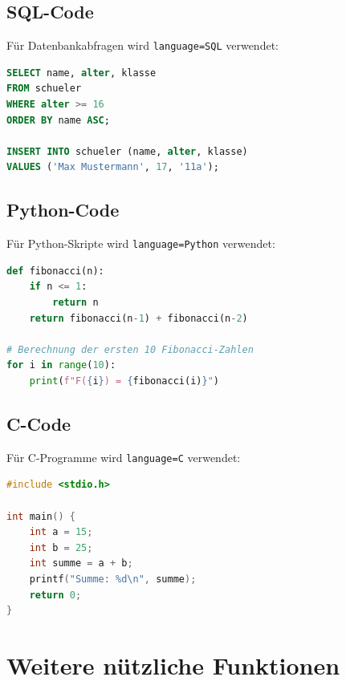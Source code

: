 \subsection{SQL-Code}

Für Datenbankabfragen wird \texttt{language=SQL} verwendet:

\begin{lstlisting}[language=SQL]
SELECT name, alter, klasse
FROM schueler
WHERE alter >= 16
ORDER BY name ASC;

INSERT INTO schueler (name, alter, klasse)
VALUES ('Max Mustermann', 17, '11a');
\end{lstlisting}



\subsection{Python-Code}

Für Python-Skripte wird \texttt{language=Python} verwendet:

\begin{lstlisting}[language=Python]
def fibonacci(n):
    if n <= 1:
        return n
    return fibonacci(n-1) + fibonacci(n-2)

# Berechnung der ersten 10 Fibonacci-Zahlen
for i in range(10):
    print(f"F({i}) = {fibonacci(i)}")
\end{lstlisting}



\subsection{C-Code}

Für C-Programme wird \texttt{language=C} verwendet:

\begin{lstlisting}[language=C]
#include <stdio.h>

int main() {
    int a = 15;
    int b = 25;
    int summe = a + b;
    printf("Summe: %d\n", summe);
    return 0;
}
\end{lstlisting}



\section{Weitere nützliche Funktionen}



